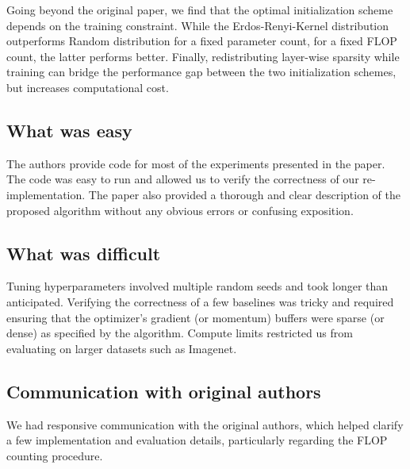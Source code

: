 Going beyond the original paper, we find that the optimal initialization scheme depends on the training constraint. While the Erdos-Renyi-Kernel distribution outperforms Random distribution for a fixed parameter count, for a fixed FLOP count, the latter performs better. Finally, redistributing layer-wise sparsity while training can bridge the performance gap between the two initialization schemes, but increases computational cost.

\subsection*{What was easy}

The authors provide code for most of the experiments presented in the paper. The code was easy to run and allowed us to verify the correctness of our re-implementation. The paper also provided a thorough and clear description of the proposed algorithm without any obvious errors or confusing exposition. 

\subsection*{What was difficult}

Tuning hyperparameters involved multiple random seeds and took longer than anticipated. Verifying the correctness of a few baselines was tricky and required ensuring that the optimizer's gradient (or momentum) buffers were sparse (or dense) as specified by the algorithm. Compute limits restricted us from evaluating on larger datasets such as Imagenet.

\subsection*{Communication with original authors}

We had responsive communication with the original authors, which helped clarify a few implementation and evaluation details, particularly regarding the FLOP counting procedure.